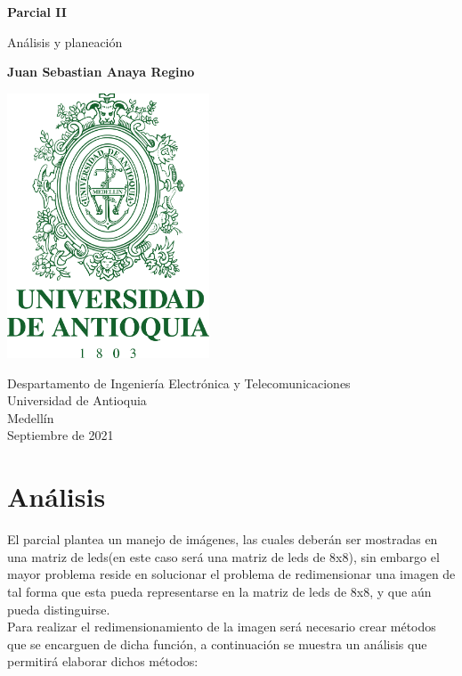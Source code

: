 \documentclass{article}
\begin{document}
\begin{titlepage}
    \begin{center}
        \vspace*{1cm}
            
        \Huge
        \textbf{Parcial II}
            
        \vspace{0.5cm}
        \LARGE
        Análisis y planeación
            
        \vspace{1.5cm}
            
        \textbf{Juan Sebastian Anaya Regino}
            
        \vspace{0.9cm}
        \centering
        \includegraphics[width=6cm]{images/logo.png}
            
        \vfill
            
        \vspace{0.8cm}
            
        \Large
        Despartamento de Ingeniería Electrónica y Telecomunicaciones\\
        Universidad de Antioquia\\
        Medellín\\
        Septiembre de 2021
            
    \end{center}
\end{titlepage}

\tableofcontents
\newpage

\section{Análisis}
El parcial plantea un manejo de imágenes, las cuales deberán ser mostradas en una matriz de leds(en este caso será una matriz de leds de 8x8), sin embargo el mayor problema reside en solucionar el problema de redimensionar una imagen de tal forma que esta pueda representarse en la matriz de leds de 8x8, y que aún pueda distinguirse. \\
Para realizar el redimensionamiento de la imagen será necesario crear métodos que se encarguen de dicha función, a continuación se muestra un análisis que permitirá elaborar dichos métodos:
\end{document}
